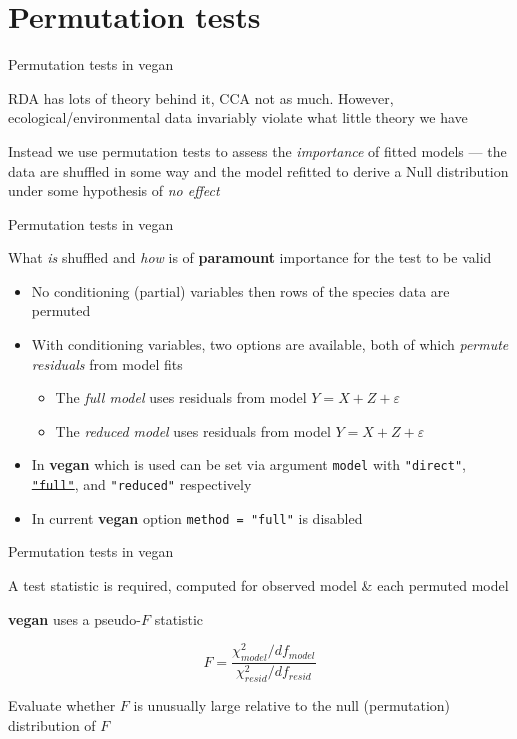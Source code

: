 \documentclass[10pt,ignorenonframetext,compress, aspectratio=169]{beamer}
\providecommand{\tightlist}{%
  \setlength{\itemsep}{0pt}\setlength{\parskip}{0pt}}
\begin{document}
\section{Permutation tests}\label{permutation-tests}

\begin{frame}{Permutation tests in vegan}

RDA has lots of theory behind it, CCA not as much. However,
ecological/environmental data invariably violate what little theory we
have

Instead we use permutation tests to assess the \emph{importance} of
fitted models --- the data are shuffled in some way and the model
refitted to derive a Null distribution under some hypothesis of \emph{no
effect}

\end{frame}

\begin{frame}[fragile]{Permutation tests in vegan}

What \emph{is} shuffled and \emph{how} is of \textbf{paramount}
importance for the test to be valid

\begin{itemize}
\tightlist
\item
  No conditioning (partial) variables then rows of the species data are
  permuted
\item
  With conditioning variables, two options are available, both of which
  \emph{permute residuals} from model fits

  \begin{itemize}
  \tightlist
  \item
    The \emph{full model} uses residuals from model
    \(Y = X + Z + \varepsilon\)
  \item
    The \emph{reduced model} uses residuals from model
    \(Y = X + Z + \varepsilon\)
  \end{itemize}
\item
  In \textbf{vegan} which is used can be set via argument \texttt{model}
  with \texttt{"direct"}, \sout{\texttt{"full"}}, and \texttt{"reduced"}
  respectively
\item
  In current \textbf{vegan} option \texttt{method\ =\ "full"} is
  disabled
\end{itemize}

\end{frame}

\begin{frame}{Permutation tests in vegan}

A test statistic is required, computed for observed model \& each
permuted model

\textbf{vegan} uses a pseudo-\(F\) statistic

\[F=\frac{\chi^2_{model} / df_{model}}{\chi^2_{resid} / df_{resid}}\]

Evaluate whether \(F\) is unusually large relative to the null
(permutation) distribution of \(F\)

\end{frame}
\end{document}
